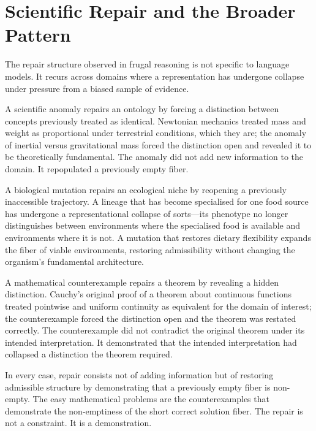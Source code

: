 \documentclass[11pt]{article}
\theoremstyle{rthm}
\theoremstyle{rdef}
\theoremstyle{remark}
\begin{document}
\section{Scientific Repair and the Broader Pattern}
\label{sec:broader}

The repair structure observed in frugal reasoning is not specific to
language models. It recurs across domains where a representation has
undergone collapse under pressure from a biased sample of evidence.

A scientific anomaly repairs an ontology by forcing a distinction
between concepts previously treated as identical. Newtonian mechanics
treated mass and weight as proportional under terrestrial conditions,
which they are; the anomaly of inertial versus gravitational mass
forced the distinction open and revealed it to be theoretically
fundamental. The anomaly did not add new information to the domain.
It repopulated a previously empty fiber.

A biological mutation repairs an ecological niche by reopening a
previously inaccessible trajectory. A lineage that has become
specialised for one food source has undergone a representational
collapse of sorts---its phenotype no longer distinguishes between
environments where the specialised food is available and environments
where it is not. A mutation that restores dietary flexibility
expands the fiber of viable environments, restoring admissibility
without changing the organism's fundamental architecture.

A mathematical counterexample repairs a theorem by revealing a
hidden distinction. Cauchy's original proof of a theorem about
continuous functions treated pointwise and uniform continuity as
equivalent for the domain of interest; the counterexample forced
the distinction open and the theorem was restated correctly. The
counterexample did not contradict the original theorem under its
intended interpretation. It demonstrated that the intended
interpretation had collapsed a distinction the theorem required.

In every case, repair consists not of adding information but of
restoring admissible structure by demonstrating that a previously
empty fiber is non-empty. The easy mathematical problems are the
counterexamples that demonstrate the non-emptiness of the short
correct solution fiber. The repair is not a constraint. It is a
demonstration.
\end{document}

